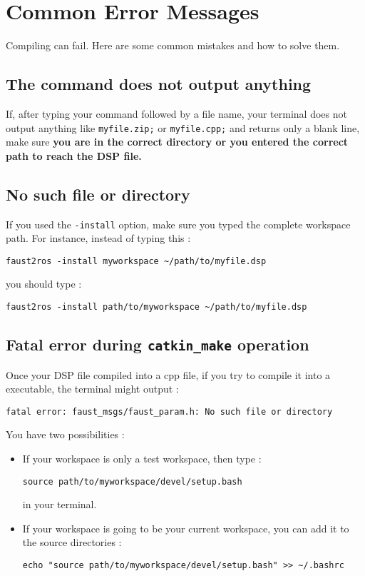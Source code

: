 \chapter{Common Error Messages}
\label{chap:errors}
Compiling can fail. Here are some common mistakes and how to solve them.
\section{The command does not output anything}
If, after typing your command followed by a file name, your terminal does not output anything like \lstinline'myfile.zip;' or \lstinline'myfile.cpp;' and returns only a blank line, make sure \textbf{you are in the correct directory or you entered the correct path to reach the DSP file.} 

\section{No such file or directory}
If you used the \lstinline'-install' option, make sure you typed the complete workspace path.
For instance, instead of typing this :
\begin{lstlisting}
faust2ros -install myworkspace ~/path/to/myfile.dsp
\end{lstlisting}
you should type :
\begin{lstlisting}
faust2ros -install path/to/myworkspace ~/path/to/myfile.dsp
\end{lstlisting}

\section{Fatal error during \lstinline'catkin_make' operation}
Once your DSP file compiled into a cpp file, if you try to compile it into a \ros executable, the terminal might output :
\begin{lstlisting}
fatal error: faust_msgs/faust_param.h: No such file or directory
\end{lstlisting}
\newpage
You have two possibilities :

\begin{itemize}[leftmargin=*]
	\item If your workspace is only a test workspace, then type :
	\begin{lstlisting}
source path/to/myworkspace/devel/setup.bash
	\end{lstlisting}
	in your terminal.
	\item If your workspace is going to be your current \ros workspace, you can add it to the source directories :
	\begin{lstlisting}
echo "source path/to/myworkspace/devel/setup.bash" >> ~/.bashrc 
	\end{lstlisting}
\end{itemize}

